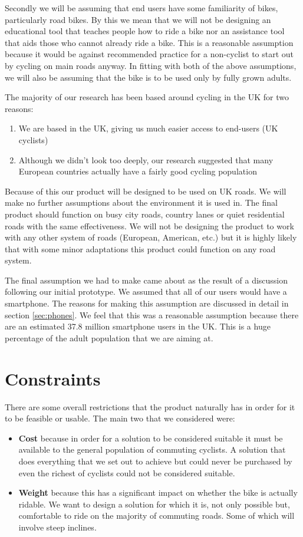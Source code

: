 \documentclass[a4paper]{report}
\begin{document}
Secondly we will be assuming that end users have some familiarity of bikes, particularly road bikes. By this we mean that we will not be designing an educational tool that teaches people how to ride a bike nor an assistance tool that aids those who cannot already ride a bike. This is a reasonable assumption because it would be against recommended practice for a non-cyclist to start out by cycling on main roads anyway. %
In fitting with both of the above assumptions, we will also be assuming that the bike is to be used only by fully grown adults.

The majority of our research has been based around cycling in the UK for two reasons:
\begin{enumerate}
  \item We are based in the UK, giving us much easier access to end-users (UK cyclists)
  \item Although we didn't look too deeply, our research suggested that many European countries actually have a fairly good cycling population
\end{enumerate} 
Because of this our product will be designed to be used on UK roads. We will make no further assumptions about the environment it is used in. The final product should function on busy city roads, country lanes or quiet residential roads with the same effectiveness. We will not be designing the product to work with any other system of roads (European, American, etc.) but it is highly likely that with some minor adaptations this product could function on any road system.

The final assumption we had to make came about as the result of a discussion following our initial prototype. We assumed that all of our users would have a smartphone. The reasons for making this assumption are discussed in detail in section \ref{sec:phones}. We feel that this was a reasonable assumption because there are an estimated 37.8 million smartphone users in the UK\cite{smartphones}. This is a huge percentage of the adult population that we are aiming at.

\section{Constraints}
There are some overall restrictions that the product naturally has in order for it to be feasible or usable. The main two that we considered were:
\begin{itemize}
  \item \textbf{Cost} because in order for a solution to be considered suitable it must be available to the general population of commuting cyclists. A solution that does everything that we set out to achieve but could never be purchased by even the richest of cyclists could not be considered suitable.
  \item \textbf{Weight} because this has a significant impact on whether the bike is actually ridable. We want to design a solution for which it is, not only possible but, comfortable to ride on the majority of commuting roads. Some of which will involve steep inclines.  
\end{itemize}
\end{document}
